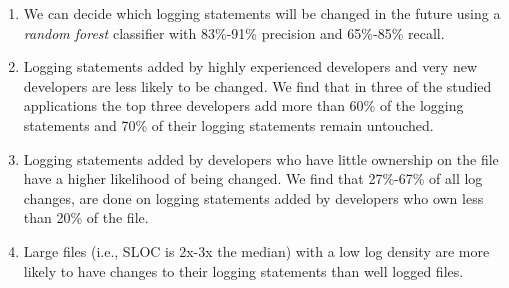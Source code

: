\begin{enumerate}
	\item We can decide which logging statements will be changed in the future using a \emph{random forest} classifier with 83\%-91\% precision and 65\%-85\% recall.


	\item Logging statements added  by highly experienced developers and very new developers are less likely to be changed. We find that in three of the studied applications the top three developers add more than 60\% of the logging statements and 70\% of their logging statements remain untouched. 
	
	
	\item Logging statements added by developers who have little ownership on the file have a higher likelihood of being changed. We find that 27\%-67\% of all log changes, are done on logging statements added by developers who own less than 20\% of the file.
	
	
	
	\item Large files (i.e., SLOC is 2x-3x the median) with a low log density are more likely to have changes to their logging statements than well logged files.


\end{enumerate}

